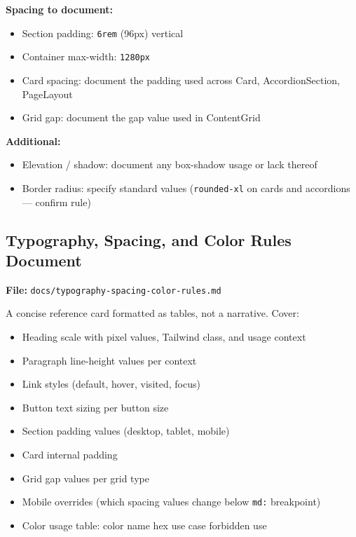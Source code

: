 \documentclass[12pt,a4paper]{article}
\begin{document}
\vspace{0.8em}
\noindent\textbf{Spacing to document:}

\begin{itemize}
    \item Section padding: \texttt{6rem} (96px) vertical
    \item Container max-width: \texttt{1280px}
    \item Card spacing: document the padding used across Card, AccordionSection, PageLayout
    \item Grid gap: document the gap value used in ContentGrid
\end{itemize}

\vspace{0.8em}
\noindent\textbf{Additional:}

\begin{itemize}
    \item Elevation / shadow: document any box-shadow usage or lack thereof
    \item Border radius: specify standard values (\texttt{rounded-xl} on cards and accordions --- confirm rule)
\end{itemize}

\subsection{Typography, Spacing, and Color Rules Document}

\textbf{File:} \texttt{docs/typography-spacing-color-rules.md}

A concise reference card formatted as tables, not a narrative. Cover:

\begin{itemize}
    \item Heading scale with pixel values, Tailwind class, and usage context
    \item Paragraph line-height values per context
    \item Link styles (default, hover, visited, focus)
    \item Button text sizing per button size
    \item Section padding values (desktop, tablet, mobile)
    \item Card internal padding
    \item Grid gap values per grid type
    \item Mobile overrides (which spacing values change below \texttt{md:} breakpoint)
    \item Color usage table: color name \textrightarrow{} hex \textrightarrow{} use case \textrightarrow{} forbidden use
\end{itemize}
\end{document}
